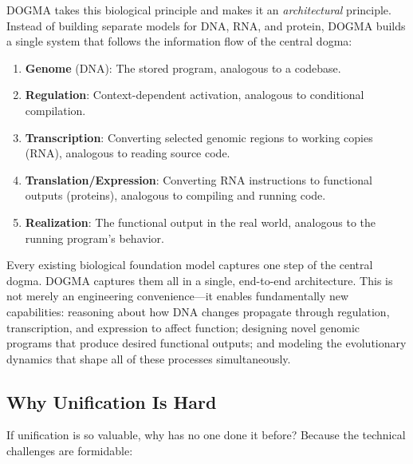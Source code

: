 DOGMA takes this biological principle and makes it an \emph{architectural} principle. Instead of building separate models for DNA, RNA, and protein, DOGMA builds a single system that follows the information flow of the central dogma:

\begin{enumerate}[leftmargin=1.8em]
  \item \textbf{Genome} (DNA): The stored program, analogous to a codebase.
  \item \textbf{Regulation}: Context-dependent activation, analogous to conditional compilation.
  \item \textbf{Transcription}: Converting selected genomic regions to working copies (RNA), analogous to reading source code.
  \item \textbf{Translation/Expression}: Converting RNA instructions to functional outputs (proteins), analogous to compiling and running code.
  \item \textbf{Realization}: The functional output in the real world, analogous to the running program's behavior.
\end{enumerate}

\begin{keyinsight}
Every existing biological foundation model captures one step of the central dogma. DOGMA captures them all in a single, end-to-end architecture. This is not merely an engineering convenience---it enables fundamentally new capabilities: reasoning about how DNA changes propagate through regulation, transcription, and expression to affect function; designing novel genomic programs that produce desired functional outputs; and modeling the evolutionary dynamics that shape all of these processes simultaneously.
\end{keyinsight}

\subsection{Why Unification Is Hard}

If unification is so valuable, why has no one done it before? Because the technical challenges are formidable:

